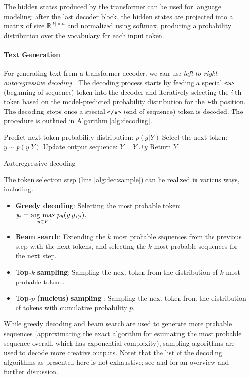 {The hidden states produced by the transformer can be used for language modeling: after the last decoder block, the hidden states are projected into a matrix of size $\mathbb{R}^{|V|\times n}$ and normalized using softmax, producing a probability distribution over the vocabulary for each input token.

\paragraph{Text Generation} For generating text from a transformer decoder, we can use \textit{left-to-right autoregressive decoding} \cite[p.196]{jurafsky2024}. The decoding process starts by feeding a special \texttt{<s>} (beginning of sequence) token into the decoder and iteratively selecting the \emph{i}-th token based on the model-predicted probability distribution for the \emph{i}-th position. The decoding stops once a special \texttt{</s>} (end of sequence) token is decoded. The procedure is outlined in Algorithm \ref{alg:decoding}.
\begin{algorithm}[ht]
    \begin{algorithmic}[1]
        \State Predict next token probability distribution: $p(y | Y)$
        \State Select the next token: $y \sim p(y | Y)$ \label{alg:dec:sample}
        \State Update output sequence: $Y = Y \cup y$
        \EndWhile
        \State Return $Y$
    \end{algorithmic}
    \caption{Autoregressive decoding}
    \label{alg:decoding}
\end{algorithm}

\noindent The token selection step (line \ref{alg:dec:sample}) can be realized in various ways, including:
\begin{itemize}
    \item \textbf{Greedy decoding}: Selecting the most probable token: $y_i = \underset{y \in V}{\operatorname{arg}\,\operatorname{max}}\; p_\theta(y|y_{<i}).$
    \item \textbf{Beam search}: Extending the $k$ most probable sequences from the previous step with the next tokens, and selecting the $k$ most probable sequences for the next step.
    \item \textbf{Top-$k$ sampling}: Sampling the next token from the distribution of $k$ most probable tokens.
    \item \textbf{Top-$p$ (nucleus) sampling} \cite{holtzman2019curious}: Sampling the next token from the distribution of tokens with cumulative probability $p$.
\end{itemize}
While greedy decoding and beam search are used to generate more probable sequences (approximating the exact algorithm for estimating the most probable sequence overall, which has exponential complexity), sampling algorithms are used to decode more creative outputs. Notet that the list of the decoding algorithms as presented here is not exhaustive; see \citet{zarriess2021decoding} and \citet{wiher2022decoding} for an overview and further discussion.

}
